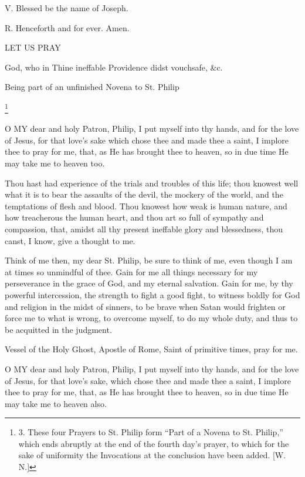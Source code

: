 V. Blessed be the name of Joseph.

R. Henceforth and for ever. Amen.

LET
US PRAY

God, who in Thine ineffable Providence didst
vouchsafe, \&c.


Being part of an unfinished Novena to St. Philip

\footnote{3.
These four Prayers to St. Philip form “Part of a Novena to St.
Philip,” which ends abruptly at the end of the fourth day’s prayer,
to which for the sake of uniformity the Invocations at the conclusion
have been added. [W. N.]}


O MY dear and
holy Patron, Philip, I put myself into thy hands, and for the love of
Jesus, for that love’s sake which chose thee and made thee a saint, I
implore thee to pray for me, that, as He has brought thee to heaven, so
in due time He may take me to heaven too.

Thou hast had experience of the trials and troubles
of this life; thou knowest well what it is to bear the assaults of the
devil, the mockery of the world, and the temptations of flesh and blood.
Thou knowest how weak is human nature, and how treacherous the human
heart, and thou art so full of sympathy and compassion, that, amidst all
thy present ineffable glory and blessedness, thou canst, I know, give a
thought to me.

Think of me then, my dear St. Philip, be sure to
think of me, even though I am at times so unmindful of thee. Gain for me
all things necessary for my perseverance in the grace of God, and my
eternal salvation. Gain for me, by thy powerful intercession, the
strength to fight a good fight, to witness boldly for God and religion
in the midst of sinners, to be brave when Satan would frighten or force
me to what is wrong, to overcome myself, to do my whole duty, and thus
to be acquitted in the judgment.

Vessel of the Holy Ghost, Apostle of Rome, Saint of
primitive times, pray for me.


O MY dear and
holy Patron, Philip, I put myself into thy hands, and for the love of
Jesus, for that love’s sake, which chose thee and made thee a saint, I
implore thee to pray for me, that, as He has brought thee to heaven, so
in due time He may take me to heaven also.

